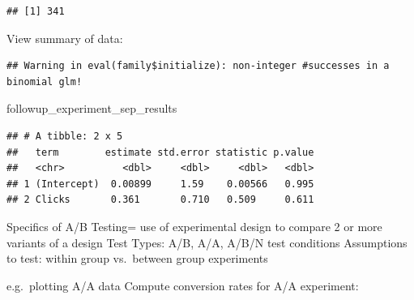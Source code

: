 \documentclass[]{book}
\newenvironment{Shaded}{\begin{snugshade}}{\end{snugshade}}
\newcommand{\CommentTok}[1]{\textcolor[rgb]{0.56,0.35,0.01}{\textit{#1}}}
\newcommand{\DataTypeTok}[1]{\textcolor[rgb]{0.13,0.29,0.53}{#1}}
\newcommand{\DecValTok}[1]{\textcolor[rgb]{0.00,0.00,0.81}{#1}}
\newcommand{\KeywordTok}[1]{\textcolor[rgb]{0.13,0.29,0.53}{\textbf{#1}}}
\newcommand{\NormalTok}[1]{#1}
\newcommand{\OperatorTok}[1]{\textcolor[rgb]{0.81,0.36,0.00}{\textbf{#1}}}
\newcommand{\StringTok}[1]{\textcolor[rgb]{0.31,0.60,0.02}{#1}}
\begin{document}
\begin{verbatim}
## [1] 341
\end{verbatim}

View summary of data:

\begin{Shaded}
\end{Shaded}

\begin{verbatim}
## Warning in eval(family$initialize): non-integer #successes in a binomial glm!
\end{verbatim}

\begin{Shaded}
\begin{Highlighting}[]
\NormalTok{followup_experiment_sep_results}
\end{Highlighting}
\end{Shaded}

\begin{verbatim}
## # A tibble: 2 x 5
##   term        estimate std.error statistic p.value
##   <chr>          <dbl>     <dbl>     <dbl>   <dbl>
## 1 (Intercept)  0.00899     1.59    0.00566   0.995
## 2 Clicks       0.361       0.710   0.509     0.611
\end{verbatim}

Specifics of A/B Testing= use of experimental design to compare 2 or more variants of a design
Test Types: A/B, A/A, A/B/N test conditions
Assumptions to test: within group vs.~between group experiments

e.g.~plotting A/A data
Compute conversion rates for A/A experiment:
\end{document}
